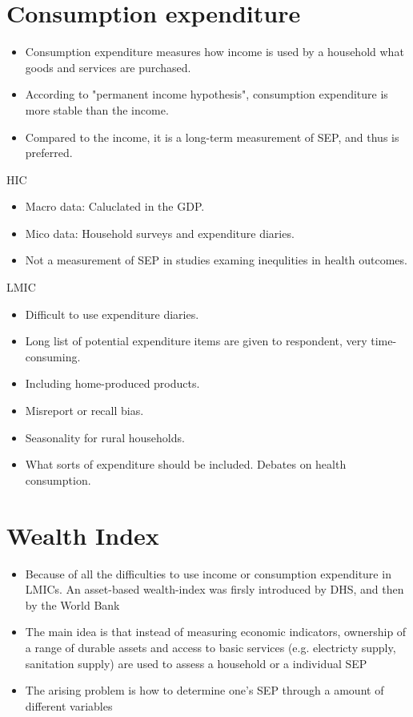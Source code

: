 \documentclass[13pt]{beamer}
\begin{document}
\section{Consumption expenditure}
\begin{frame}
	\begin{itemize}
		\item Consumption expenditure measures how income is used by a household what goods and services are purchased.
		\item According to "permanent income hypothesis", consumption expenditure is more stable than the income.
		\item Compared to the income, it is a long-term measurement of SEP, and thus is preferred.
	\end{itemize}
			\begin{block}{HIC}
					\begin{itemize}
						\item Macro data: Caluclated in the GDP.
						\item Mico data: Household surveys and expenditure diaries.
						\item Not a measurement of SEP in studies examing inequlities in health outcomes.
					\end{itemize}
			\end{block}
\end{frame}
\begin{frame}
			\begin{block}{LMIC}
					\begin{itemize}
					\item Difficult to use expenditure diaries.
					\item Long list of potential expenditure items are given to respondent, very time-consuming.
					\item Including home-produced products.
					\item Misreport or recall bias.
					\item Seasonality for rural households.
					\item What sorts of expenditure should be included. Debates on health consumption.
					\end{itemize}
			\end{block}
\end{frame}
\section{Wealth Index}
\begin{frame}
	\begin{itemize}
		\item Because of all the difficulties to use income or consumption expenditure in LMICs. An asset-based wealth-index was firsly introduced by DHS, and then by the World Bank
		\item The main idea is that instead  of measuring economic indicators, ownership of a range of durable assets and access to basic services (e.g. electricty supply, sanitation supply) are used to assess a household or a individual SEP
		\item The arising problem is how to determine one's SEP through a amount of different variables
	\end{itemize}
\end{frame}
\end{document}
